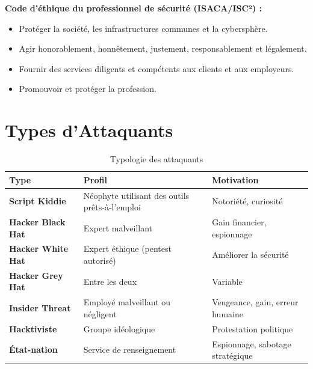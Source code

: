 \begin{boxalert}
\textbf{Code d'éthique du professionnel de sécurité (ISACA/ISC²) :}
\begin{itemize}
    \item Protéger la société, les infrastructures communes et la cybersphère.
    \item Agir honorablement, honnêtement, justement, responsablement et légalement.
    \item Fournir des services diligents et compétents aux clients et aux employeurs.
    \item Promouvoir et protéger la profession.
\end{itemize}
\end{boxalert}

\section{Types d'Attaquants}

\begin{table}[H]
\centering
\small
\begin{tabular}{p{3cm}p{4cm}p{5cm}}
    \toprule
    \textbf{Type} & \textbf{Profil} & \textbf{Motivation} \\
    \midrule
    \textbf{Script Kiddie}    & Néophyte utilisant des outils prêts-à-l'emploi & Notoriété, curiosité \\
    \textbf{Hacker Black Hat} & Expert malveillant & Gain financier, espionnage \\
    \textbf{Hacker White Hat} & Expert éthique (pentest autorisé) & Améliorer la sécurité \\
    \textbf{Hacker Grey Hat}  & Entre les deux & Variable \\
    \textbf{Insider Threat}   & Employé malveillant ou négligent & Vengeance, gain, erreur humaine \\
    \textbf{Hacktiviste}      & Groupe idéologique & Protestation politique \\
    \textbf{État-nation}      & Service de renseignement & Espionnage, sabotage stratégique \\
    \bottomrule
\end{tabular}
\caption{Typologie des attaquants}
\end{table}

